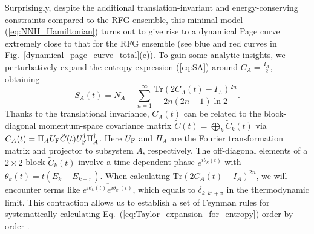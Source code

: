 \documentclass[twocolumn,english,prl,aps,superscriptaddress,amsmath,amssymb,floatfix]{revtex4-2}
\begin{document}
Surprisingly, despite the additional translation-invariant and energy-conserving constraints compared to the RFG ensemble, this minimal model (\ref{eq:NNH_Hamiltonian}) turns out to give rise to %
a dynamical Page curve extremely close to that for the %
RFG ensemble %
(see blue and red curves in Fig.~\ref{dynamical_page_curve_total}(c)). 
To gain some analytic insights, we perturbatively expand %
the entropy expression (\ref{eq:SA}) %
around $C_{A}=\frac{I_{A}}{2}$, obtaining %
\begin{equation}
S_{A}(t)=N_{A}-%
\sum_{n=1}^{\infty}\frac{\mathrm{Tr}(2C_{A}(t)-I_{A}){}^{2n}}{2n(2n-1)\ln2}.
\label{eq:Taylor_expansion_for_entropy}
\end{equation}
Thanks to the translational invariance, $C_{A}(t)$ can be related to the block-diagonal momentum-space covariance matrix $\tilde C(t)=\bigoplus_k\tilde C_k(t)$ via %
$C_{A}(t)=\Pi_{A}U_{\rm F}\tilde{C}(t)U^{\dagger}_{\rm F}\Pi_{A}^\dagger$. Here
$U_{\rm F}$ and $\Pi_{A}$ are the Fourier transformation matrix and projector %
to subsystem $A$, respectively. %
The off-diagonal
elements of a $2\times2$ block $\tilde{C}_k(t)$ involve %
a time-dependent %
phase
$e^{i\theta_{k}(t)}$ with %
$\theta_{k}(t)=t(E_{k}-E_{k+\pi})$.
When calculating $\overline{\mathrm{Tr}(2C_{A}(t)-I_{A})^{2n}}$, 
we will encounter %
terms like $\overline{e^{i\theta_{k}(t)}e^{i\theta_{k'}(t)}}$,
which equals to $\delta_{k,k'+\pi}$ in the thermodynamic limit.
This contraction allows us to establish a set of Feynman rules for %
systematically calculating Eq.~(\ref{eq:Taylor_expansion_for_entropy})
order by order \cite{SM}. %
\end{document}
